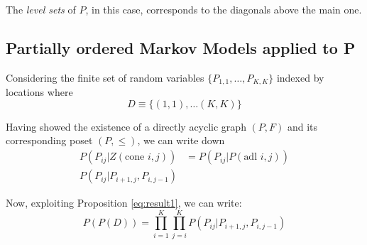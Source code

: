 \documentclass[11pt]{amsart}
\begin{document}
The \textit{level sets} of $P$, in this case, corresponds to the diagonals above the main one.


\subsection{Partially ordered Markov Models applied to P}
\bigskip
Considering the finite set of random variables $\{P_{1,1},\dots, P_{K,K} \}$ indexed by locations where 
$$D\equiv \{(1,1), \dots (K,K)\}$$

Having showed the existence of a directly acyclic graph $ (P,F)$ and its corresponding poset $(P, \leq)$, we can write down 
\begin{align}
P(P_{ij}| Z(\text{cone } i,j)) &= P(P_{ij}| P(\text{adl } i,j))\\
P(P_{ij}| P_{i+1,j}, P_{i,j-1})
\end{align}

Now, exploiting Proposition \eqref{eq:result1}, we can write:
\begin{equation}
P(P(D)) = \prod_{i=1}^K\prod_{j=i}^K P(P_{ij}| P_{i+1,j}, P_{i,j-1})
\end{equation}
\end{document}
